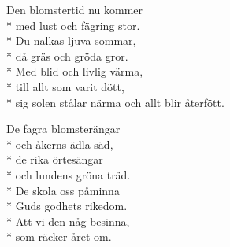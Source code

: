 \begin{SongText}
    \begin{SongVerse}
        Den blomstertid nu kommer\\*%
        med lust och fägring stor.\\*%
        Du nalkas ljuva sommar,\\*%
        då gräs och gröda gror.\\*%
        Med blid och livlig värma,\\*%
        till allt som varit dött,\\*%
        sig solen stålar närma och allt blir återfött.
    \end{SongVerse}
    \begin{SongVerse}
        De fagra blomsterängar\\*%
        och åkerns ädla säd,\\*%
        de rika örtesängar\\*%
        och lundens gröna träd.\\*%
        De skola oss påminna\\*%
        Guds godhets rikedom.\\*%
        Att vi den någ besinna,\\*%
        som räcker året om.
    \end{SongVerse}
\end{SongText}
\newpage